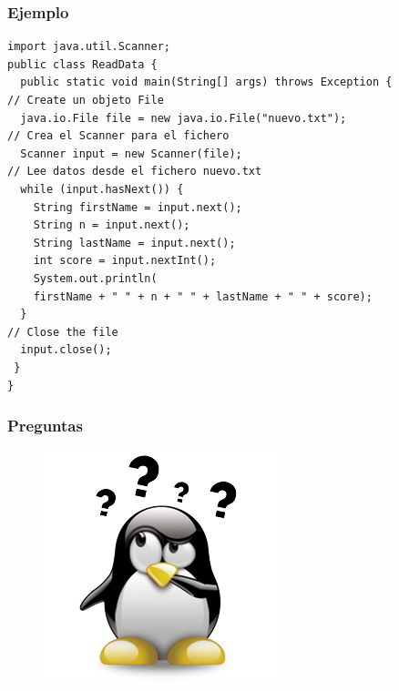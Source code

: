 \documentclass{beamer}
\begin{document}
\begin{frame}[fragile]
\frametitle{Ejemplo}
\begin{small}
\begin{verbatim}
import java.util.Scanner;
public class ReadData {
  public static void main(String[] args) throws Exception {
// Create un objeto File 
  java.io.File file = new java.io.File("nuevo.txt");
// Crea el Scanner para el fichero
  Scanner input = new Scanner(file);
// Lee datos desde el fichero nuevo.txt
  while (input.hasNext()) {
    String firstName = input.next();
    String n = input.next();
    String lastName = input.next();
    int score = input.nextInt();
    System.out.println(
    firstName + " " + n + " " + lastName + " " + score);
  }
// Close the file
  input.close();
 }
}
\end{verbatim}
\end{small}
\end{frame}

\begin{frame}
\frametitle{Preguntas} 
\begin{figure}
\includegraphics[scale=0.9]{imagenes/dudas.png} 
\end{figure} 
\end{frame}
\end{document}
